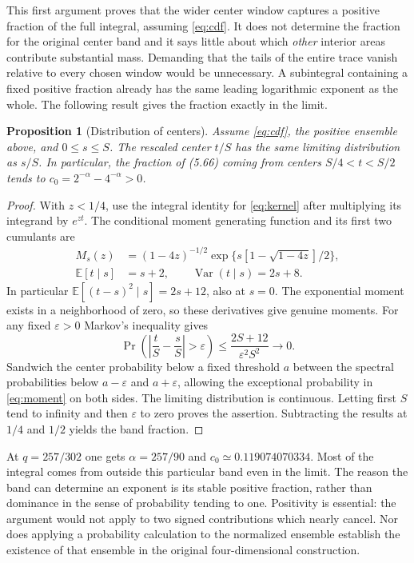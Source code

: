 \documentclass[11pt]{article}
\newcommand{\Prob}{\operatorname{Pr}}
\newcommand{\E}{\mathbb E}
\newcommand{\var}{\operatorname{Var}}
\newtheorem{prop}{Proposition}
\begin{document}
This first argument proves that the wider center window captures a positive fraction of the full integral, assuming \eqref{eq:cdf}. It does not determine the fraction for the original center band and it says little about which \emph{other} interior areas contribute substantial mass. Demanding that the tails of the entire trace vanish relative to every chosen window would be unnecessary. A subintegral containing a fixed positive fraction already has the same leading logarithmic exponent as the whole. The following result gives the fraction exactly in the limit.

\begin{prop}[Distribution of centers]\label{prop:center}
Assume \eqref{eq:cdf}, the positive ensemble above, and $0\le s\le S$. The rescaled center $t/S$ has the same limiting distribution as $s/S$. In particular, the fraction of (5.66) coming from centers $S/4<t<S/2$ tends to $c_0=2^{-\alpha}-4^{-\alpha}>0$.
\end{prop}
\begin{proof}
With $z<1/4$, use the integral identity for \eqref{eq:kernel} after multiplying its integrand by $e^{zt}$. The conditional moment generating function and its first two cumulants are
\begin{align*}
 M_s(z)&=(1-4z)^{-1/2}
       \exp\{s[1-\sqrt{1-4z}]/2\},\\
 \E[t\mid s]&=s+2,\qquad \var(t\mid s)=2s+8.
\end{align*}
In particular $\E[(t-s)^2\mid s]=2s+12$, also at $s=0$. The exponential moment exists in a neighborhood of zero, so these derivatives give genuine moments. For any fixed $\varepsilon>0$ Markov's inequality gives
\begin{equation}\label{eq:moment}
 \Prob\!\left(\left|\frac{t}{S}-\frac{s}{S}\right|>\varepsilon\right)
 \le \frac{2S+12}{\varepsilon^2 S^2}\longrightarrow0 .
\end{equation}
Sandwich the center probability below a fixed threshold $a$ between the spectral probabilities below $a-\varepsilon$ and $a+\varepsilon$, allowing the exceptional probability in \eqref{eq:moment} on both sides. The limiting distribution is continuous. Letting first $S$ tend to infinity and then $\varepsilon$ to zero proves the assertion. Subtracting the results at $1/4$ and $1/2$ yields the band fraction.
\end{proof}
At $q=257/302$ one gets $\alpha=257/90$ and $c_0\simeq0.119074070334$. Most of the integral comes from outside this particular band even in the limit. The reason the band can determine an exponent is its stable positive fraction, rather than dominance in the sense of probability tending to one. Positivity is essential: the argument would not apply to two signed contributions which nearly cancel. Nor does applying a probability calculation to the normalized ensemble establish the existence of that ensemble in the original four-dimensional construction.
\end{document}
